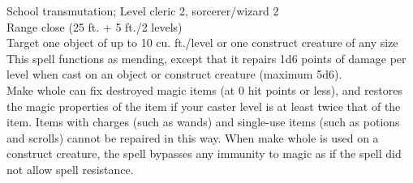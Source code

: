 School transmutation; Level cleric 2, sorcerer/wizard 2\\
Range close (25 ft. + 5 ft./2 levels)\\
Target one object of up to 10 cu. ft./level or one construct creature of any size\\
This spell functions as mending, except that it repairs 1d6 points of damage per level when cast on an object or construct creature (maximum 5d6).\\
Make whole can fix destroyed magic items (at 0 hit points or less), and restores the magic properties of the item if your caster level is at least twice that of the item. Items with charges (such as wands) and single-use items (such as potions and scrolls) cannot be repaired in this way. When make whole is used on a construct creature, the spell bypasses any immunity to magic as if the spell did not allow spell resistance.\\
